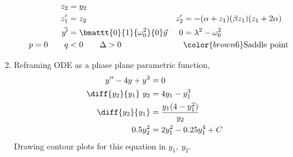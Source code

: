 \begin{enumerate}
\begin{enumerate}
\begin{align}
                        z_2            & = y_2                                         \\
                        z_1'           & = z_2                                       &
                        z_2'           & = -(\alpha + z_1)(\beta z_1)(z_1 + 2\alpha)   \\
                        \vec{y'}       & = \bmattt{0}{1}{\omega_0^{2}}{0} \vec{y}    &
                        0              & = \lambda^{2} - \omega_0^{2}                  \\
                        p = 0 \qquad q & < 0 \qquad \Delta > 0                       &
                                       & \color{brown6} \text{Saddle point}
                    \end{align}
          \end{enumerate}

    \item Reframing ODE as a phase plane parametric function,
          \begin{align}
              y'' - 4y + y^{3}     & = 0                             \\
              \diff{y_2}{y_1}\ y_2 & = 4y_1 - y_1^{3}                \\
              \diff{y_2}{y_1}      & = \frac{y_1 (4 - y_1^{2})}{y_2} \\
              0.5 y_2^{2}          & = 2y_1^{2} - 0.25y_1^{4} + C
          \end{align}
          Drawing contour plots for this equation in $ y_1,\ y_2 $.
          \begin{figure}[H]
              \centering
          \end{figure}
\end{enumerate}